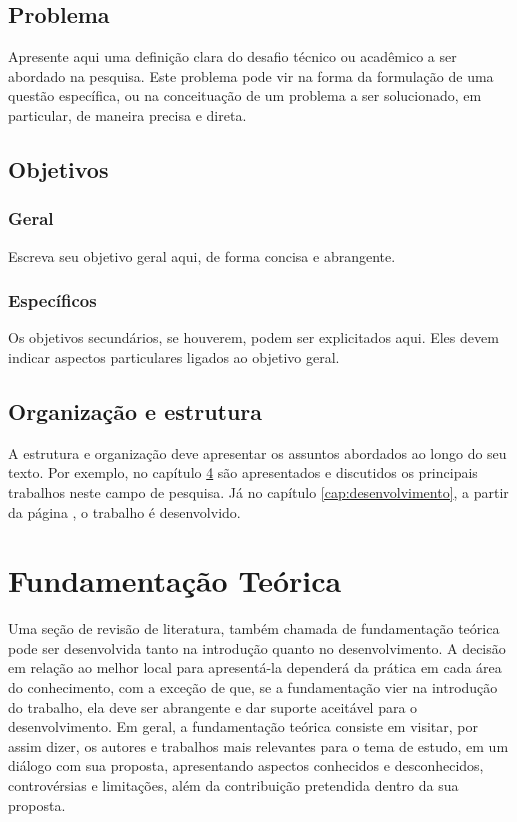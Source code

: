\documentclass[
	12pt,				%
	openright,			%
	oneside,			%
	a4paper,			%
	english,			%
	brazil				%
	]{abntex2}
\begin{document}
\section{Problema}
	Apresente aqui uma definição clara do desafio técnico ou acadêmico a ser abordado na pesquisa. Este problema pode vir na forma da formulação de uma questão específica, ou na conceituação de um problema a ser solucionado, em particular, de maneira precisa e direta.

\section{Objetivos}

\subsection{Geral}
	Escreva seu objetivo geral aqui, de forma concisa e abrangente. 

\subsection{Específicos}
	Os objetivos secundários, se houverem, podem ser explicitados aqui. Eles devem indicar aspectos particulares ligados ao objetivo geral.

\section{Organização e estrutura}
	A estrutura e organização deve apresentar os assuntos abordados ao longo do seu texto. Por exemplo, no capítulo \ref{cap:fundamentacao-teorica} são apresentados e discutidos os principais trabalhos neste campo de pesquisa. Já no capítulo \ref{cap:desenvolvimento}, a partir da página \pageref{cap:desenvolvimento}, o trabalho é desenvolvido.

\chapter{Fundamentação Teórica} \label{cap:fundamentacao-teorica}
	Uma seção de revisão de literatura, também chamada de fundamentação teórica pode ser desenvolvida tanto na introdução quanto no desenvolvimento. A decisão em relação ao melhor local para apresentá-la dependerá da prática em cada área do conhecimento, com a exceção de que, se a fundamentação vier na introdução do trabalho, ela deve ser abrangente e dar suporte aceitável para o desenvolvimento. Em geral, a fundamentação teórica consiste em visitar, por assim dizer, os autores e trabalhos mais relevantes para o tema de estudo, em um diálogo com sua proposta, apresentando aspectos conhecidos e desconhecidos, controvérsias e limitações, além da contribuição pretendida dentro da sua proposta. 
\end{document}
